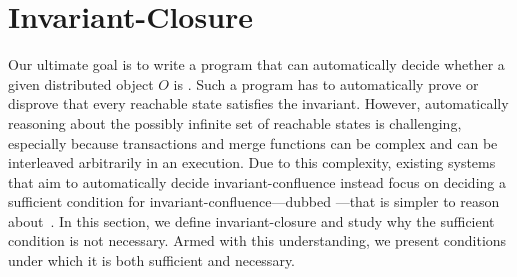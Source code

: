 \section{Invariant-Closure}
Our ultimate goal is to write a program that can automatically decide whether a
given distributed object $O$ is \sTIconfluent{}. Such a program has to
automatically prove or disprove that every reachable state satisfies the
invariant. However, automatically reasoning about the possibly infinite set of
reachable states is challenging, especially because transactions and merge
functions can be complex and can be interleaved arbitrarily in an execution.
Due to this complexity, existing systems that aim to automatically decide
invariant-confluence instead focus on deciding a sufficient condition for
invariant-confluence---dubbed ---that is simpler to
reason about~\cite{li2012making, li2014automating}. In this section, we define
invariant-closure and study why the sufficient condition is not necessary.
Armed with this understanding, we present conditions under which it is both
sufficient and necessary.



